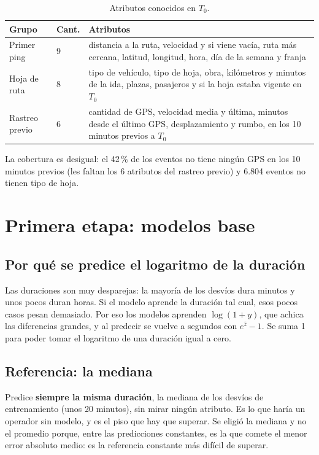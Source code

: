 \documentclass[11pt,a4paper]{article}
\begin{document}
\begin{table}[H]
  \centering
  \begin{tabular}{@{}llp{9.3cm}@{}}
    \toprule
    \textbf{Grupo} & \textbf{Cant.} & \textbf{Atributos} \\
    \midrule
    Primer ping & 9 &
      distancia a la ruta, velocidad y si viene vacía, ruta más cercana, latitud, longitud, hora, día de
      la semana y franja \\
    Hoja de ruta & 8 &
      tipo de vehículo, tipo de hoja, obra, kilómetros y minutos de la ida, plazas, pasajeros y si la hoja
      estaba vigente en $T_0$ \\
    Rastreo previo & 6 &
      cantidad de GPS, velocidad media y última, minutos desde el último GPS, desplazamiento y rumbo,
      en los 10 minutos previos a $T_0$ \\
    \bottomrule
  \end{tabular}
  \caption{Atributos conocidos en $T_0$.}
  \label{tab:atributos}
\end{table}

La cobertura es desigual: el 42\,\% de los eventos no tiene ningún GPS en los 10 minutos previos (les
faltan los 6 atributos del rastreo previo) y 6.804 eventos no tienen tipo de hoja.

\section{Primera etapa: modelos base}

\subsection{Por qué se predice el logaritmo de la duración}

Las duraciones son muy desparejas: la mayoría de los desvíos dura minutos y unos pocos duran horas. Si el
modelo aprende la duración tal cual, esos pocos casos pesan demasiado. Por eso los modelos aprenden
$\log(1+y)$, que achica las diferencias grandes, y al predecir se vuelve a segundos con $e^{\hat z}-1$. Se
suma 1 para poder tomar el logaritmo de una duración igual a cero.

\subsection{Referencia: la mediana}

Predice \textbf{siempre la misma duración}, la mediana de los desvíos de entrenamiento (unos 20 minutos),
sin mirar ningún atributo. Es lo que haría un operador sin modelo, y es el piso que hay que superar. Se
eligió la mediana y no el promedio porque, entre las predicciones constantes, es la que comete el menor
error absoluto medio: es la referencia constante más difícil de superar.
\end{document}
